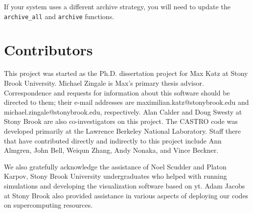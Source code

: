 \documentclass[12pt]{book}
\begin{document}
If your system uses a different archive strategy, you will need to update the \texttt{archive\_all} 
and \texttt{archive} functions.

\chapter{Contributors}
\label{sec:contributors}

This project was started as the Ph.D. dissertation project for Max Katz at Stony Brook University. 
Michael Zingale is Max's primary thesis advisor. Correspondence and requests for information 
about this software should be directed to them; their e-mail addresses are maximilian.katz@stonybrook.edu
and michael.zingale@stonybrook.edu, respectively. Alan Calder and Doug Swesty at Stony Brook are 
also co-investigators on this project. The CASTRO code was developed primarily at the 
Lawrence Berkeley National Laboratory. Staff there that have contributed directly and 
indirectly to this project include Ann Almgren, John Bell, Weiqun Zhang, Andy Nonaka, and Vince Beckner.

We also gratefully acknowledge the assistance of Noel Scudder and Platon Karpov, 
Stony Brook University undergraduates who helped with running simulations and 
developing the visualization software based on yt. Adam Jacobs at Stony Brook also provided 
assistance in various aspects of deploying our codes on supercomputing resources.

\backmatter



\end{document}
